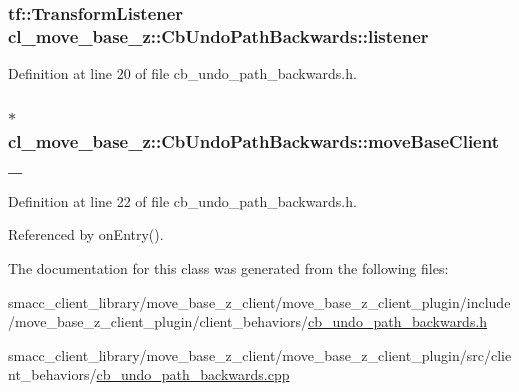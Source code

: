 \subsubsection[{\texorpdfstring{listener}{listener}}]{\setlength{\rightskip}{0pt plus 5cm}tf\+::\+Transform\+Listener cl\+\_\+move\+\_\+base\+\_\+z\+::\+Cb\+Undo\+Path\+Backwards\+::listener\hspace{0.3cm}{\ttfamily [private]}}\hypertarget{classcl__move__base__z_1_1CbUndoPathBackwards_add2b6a0f1c19654a0cf07209fc123a71}{}\label{classcl__move__base__z_1_1CbUndoPathBackwards_add2b6a0f1c19654a0cf07209fc123a71}


Definition at line 20 of file cb\+\_\+undo\+\_\+path\+\_\+backwards.\+h.

\subsubsection[{\texorpdfstring{move\+Base\+Client\+\_\+}{moveBaseClient_}}]{$\ast$ cl\+\_\+move\+\_\+base\+\_\+z\+::\+Cb\+Undo\+Path\+Backwards\+::move\+Base\+Client\+\_\+\hspace{0.3cm}{\ttfamily [private]}}\hypertarget{classcl__move__base__z_1_1CbUndoPathBackwards_a306d616dab00f50141abed4bfb47aeb2}{}\label{classcl__move__base__z_1_1CbUndoPathBackwards_a306d616dab00f50141abed4bfb47aeb2}


Definition at line 22 of file cb\+\_\+undo\+\_\+path\+\_\+backwards.\+h.



Referenced by on\+Entry().



The documentation for this class was generated from the following files\+:\begin{DoxyCompactItemize}
\item 
smacc\+\_\+client\+\_\+library/move\+\_\+base\+\_\+z\+\_\+client/move\+\_\+base\+\_\+z\+\_\+client\+\_\+plugin/include/move\+\_\+base\+\_\+z\+\_\+client\+\_\+plugin/client\+\_\+behaviors/\hyperlink{cb__undo__path__backwards_8h}{cb\+\_\+undo\+\_\+path\+\_\+backwards.\+h}\item 
smacc\+\_\+client\+\_\+library/move\+\_\+base\+\_\+z\+\_\+client/move\+\_\+base\+\_\+z\+\_\+client\+\_\+plugin/src/client\+\_\+behaviors/\hyperlink{cb__undo__path__backwards_8cpp}{cb\+\_\+undo\+\_\+path\+\_\+backwards.\+cpp}\end{DoxyCompactItemize}
